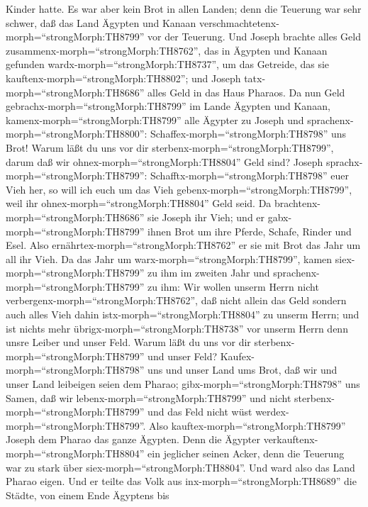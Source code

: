 Kinder hatte.  Es war aber kein Brot in allen Landen; denn
die Teuerung war sehr schwer, daß das Land Ägypten und Kanaan
verschmachtetenx-morph=``strongMorph:TH8799'' vor der Teuerung.
 Und Joseph brachte alles Geld
zusammenx-morph=``strongMorph:TH8762'', das in Ägypten und Kanaan
gefunden wardx-morph=``strongMorph:TH8737'', um das Getreide, das sie
kauftenx-morph=``strongMorph:TH8802''; und Joseph
tatx-morph=``strongMorph:TH8686'' alles Geld in das Haus Pharaos.
 Da nun Geld gebrachx-morph=``strongMorph:TH8799'' im Lande
Ägypten und Kanaan, kamenx-morph=``strongMorph:TH8799'' alle Ägypter zu
Joseph und sprachenx-morph=``strongMorph:TH8800'':
Schaffex-morph=``strongMorph:TH8798'' uns Brot! Warum läßt du uns vor
dir sterbenx-morph=``strongMorph:TH8799'', darum daß wir
ohnex-morph=``strongMorph:TH8804'' Geld sind?  Joseph
sprachx-morph=``strongMorph:TH8799'':
Schafftx-morph=``strongMorph:TH8798'' euer Vieh her, so will ich euch um
das Vieh gebenx-morph=``strongMorph:TH8799'', weil ihr
ohnex-morph=``strongMorph:TH8804'' Geld seid.  Da
brachtenx-morph=``strongMorph:TH8686'' sie Joseph ihr Vieh; und er
gabx-morph=``strongMorph:TH8799'' ihnen Brot um ihre Pferde, Schafe,
Rinder und Esel. Also ernährtex-morph=``strongMorph:TH8762'' er sie mit
Brot das Jahr um all ihr Vieh.  Da das Jahr um
warx-morph=``strongMorph:TH8799'', kamen
siex-morph=``strongMorph:TH8799'' zu ihm im zweiten Jahr und
sprachenx-morph=``strongMorph:TH8799'' zu ihm: Wir wollen unserm Herrn
nicht verbergenx-morph=``strongMorph:TH8762'', daß nicht allein das Geld
sondern auch alles Vieh dahin istx-morph=``strongMorph:TH8804'' zu
unserm Herrn; und ist nichts mehr übrigx-morph=``strongMorph:TH8738''
vor unserm Herrn denn unsre Leiber und unser Feld.  Warum
läßt du uns vor dir sterbenx-morph=``strongMorph:TH8799'' und unser
Feld? Kaufex-morph=``strongMorph:TH8798'' uns und unser Land ums Brot,
daß wir und unser Land leibeigen seien dem Pharao;
gibx-morph=``strongMorph:TH8798'' uns Samen, daß wir
lebenx-morph=``strongMorph:TH8799'' und nicht
sterbenx-morph=``strongMorph:TH8799'' und das Feld nicht wüst
werdex-morph=``strongMorph:TH8799''.  Also
kauftex-morph=``strongMorph:TH8799'' Joseph dem Pharao das ganze
Ägypten. Denn die Ägypter verkauftenx-morph=``strongMorph:TH8804'' ein
jeglicher seinen Acker, denn die Teuerung war zu stark über
siex-morph=``strongMorph:TH8804''. Und ward also das Land Pharao eigen.
 Und er teilte das Volk aus
inx-morph=``strongMorph:TH8689'' die Städte, von einem Ende Ägyptens bis

